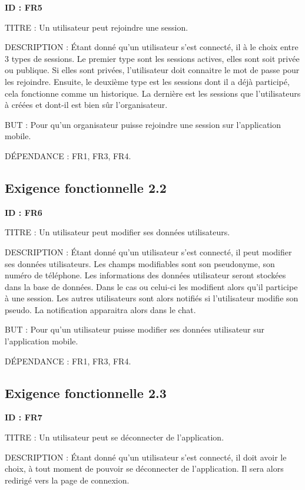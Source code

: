 \documentclass[titlepage, 12pt]{report}
\begin{document}
\textbf{ID : FR5}

TITRE : Un utilisateur peut rejoindre une session.

DESCRIPTION : Étant donné qu'un utilisateur s'est connecté, il à le choix entre 3 types de sessions. Le premier type sont les sessions actives, elles sont soit privée ou publique. Si elles sont privées, l'utilisateur doit connaitre le mot de passe pour les rejoindre. Ensuite, le deuxième type est les sessions dont il a déjà participé, cela fonctionne comme un historique. La dernière est les sessions que l'utilisateurs à créées et dont-il est bien sûr l'organisateur.

BUT : Pour qu'un organisateur puisse rejoindre une session sur l'application mobile.

DÉPENDANCE : FR1, FR3, FR4.

\subsection{Exigence fonctionnelle 2.2}

\textbf{ID : FR6}

TITRE : Un utilisateur peut modifier ses données utilisateurs.

DESCRIPTION : Étant donné qu'un utilisateur s'est connecté, il peut modifier ses données utilisateurs. Les champs modifiables sont son pseudonyme, son numéro de téléphone. Les informations des données utilisateur seront stockées dans la base de données.
Dans le cas ou celui-ci les modifient alors qu'il participe à une session. Les autres utilisateurs sont alors notifiés si l'utilisateur modifie son pseudo. La notification apparaitra alors dans le chat.

BUT : Pour qu'un utilisateur puisse modifier ses données utilisateur sur l'application mobile.

DÉPENDANCE : FR1, FR3, FR4.

\subsection{Exigence fonctionnelle 2.3}

\textbf{ID : FR7}

TITRE : Un utilisateur peut se déconnecter de l'application.

DESCRIPTION : Étant donné qu'un utilisateur s'est connecté, il doit avoir le choix, à tout moment de pouvoir se déconnecter de l'application. Il sera alors redirigé vers la page de connexion.
\end{document}
